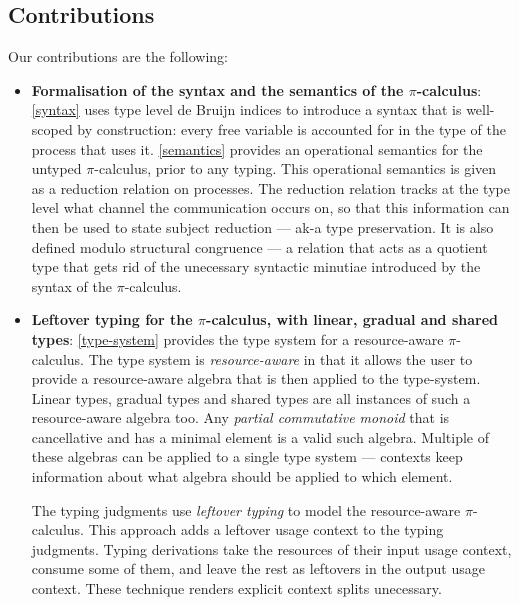 \documentclass[a4paper,UKenglish,cleveref, autoref, thm-restate,authorcolumns]{lipics-v2019}
\theoremstyle{definition}
\newcommand{\picalc}{$\pi$-calculus}
\begin{document}
\subsection{Contributions}
Our contributions are the following:
\begin{itemize}
\item \textbf{Formalisation of the syntax and the semantics of the \picalc{}}:
  \autoref{syntax} uses type level de Bruijn indices \cite{} to introduce a syntax that is well-scoped by construction: every free variable is accounted for in the type of the process that uses it.
  \autoref{semantics} provides an operational semantics for the untyped \picalc{}, prior to any typing.
  This operational semantics is given as a reduction relation on processes.
  The reduction relation tracks at the type level what channel the communication occurs on, so that this information can then be used to state subject reduction --- ak-a type preservation.
  It is also defined modulo structural congruence --- a relation that acts as a quotient type that gets rid of the unecessary syntactic minutiae introduced by the syntax of the \picalc{}.

  \item \textbf{Leftover typing for the \picalc{}, with linear, gradual and shared types}:
  \autoref{type-system} provides the type system for a resource-aware \picalc{}.
  The type system is \emph{resource-aware} in that it allows the user to provide a resource-aware algebra that is then applied to the type-system.
  Linear types, gradual types and shared types are all instances of such a resource-aware algebra too.
  Any \emph{partial commutative monoid} that is cancellative and has a minimal element is a valid such algebra.
  Multiple of these algebras can be applied to a single type system --- contexts keep information about what algebra should be applied to which element.

  The typing judgments use \emph{leftover typing} to model the resource-aware \picalc{}.
  This approach adds a leftover usage context to the typing judgments.
  Typing derivations take the resources of their input usage context, consume some of them, and leave the rest as leftovers in the output usage context.
  These technique renders explicit context splits unecessary.


\end{itemize}
\end{document}
